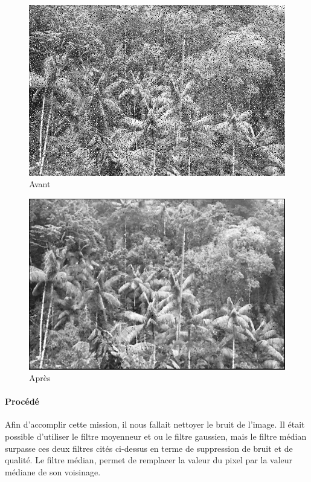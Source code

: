 	\begin{figure}[h]
	\centering
		\begin{multicols}{2}
		\includegraphics[scale=0.45]{images/Gliese_581d-V2.png}
		Avant

		\includegraphics[scale=0.45]{images/MissionX2v2.png}
		Après
		\end{multicols}
	\end{figure}
	\vspace{-0.9cm}

	\paragraph{Procédé}
	
		Afin d'accomplir cette mission, il nous fallait nettoyer le bruit de l'image. Il était possible d'utiliser le filtre moyenneur et ou le filtre gaussien, mais le filtre médian surpasse ces deux filtres cités ci-dessus en terme de suppression de bruit et de qualité. Le filtre médian, permet de remplacer la valeur du pixel par la valeur médiane de son voisinage.
